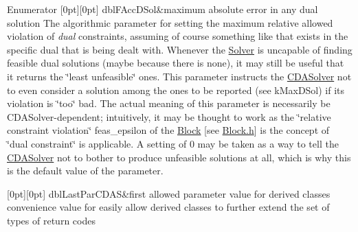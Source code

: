 \begin{DoxyEnumFields}{Enumerator}
[0pt][0pt]{}\mbox{\label{class_s_m_spp__di__unipi__it_1_1_c_d_a_solver_a12473d2c0cbab01587927c637e3f7e4ba80cb103dc992a8deaf4ffa1998b284fa}} 
dbl\+F\+Acc\+D\+Sol&maximum absolute error in any dual solution The algorithmic parameter for setting the maximum relative allowed violation of {\itshape dual} constraints, assuming of course something like that exists in the specific dual that is being dealt with. Whenever the \mbox{\hyperlink{class_s_m_spp__di__unipi__it_1_1_solver}{Solver}} is uncapable of finding feasible dual solutions (maybe because there is none), it may still be useful that it returns the \char`\"{}least unfeasible\char`\"{} ones. This parameter instructs the \mbox{\hyperlink{class_s_m_spp__di__unipi__it_1_1_c_d_a_solver}{C\+D\+A\+Solver}} not to even consider a solution among the ones to be reported (see k\+Max\+D\+Sol) if its violation is \char`\"{}too\char`\"{} bad. The actual meaning of this parameter is necessarily be C\+D\+A\+Solver-\/dependent; intuitively, it may be thought to work as the \char`\"{}relative constraint violation\char`\"{} feas\+\_\+epsilon of the \mbox{\hyperlink{class_s_m_spp__di__unipi__it_1_1_block}{Block}} \mbox{[}see \mbox{\hyperlink{_block_8h}{Block.\+h}}\mbox{]} is the concept of \char`\"{}dual constraint\char`\"{} is applicable. A setting of 0 may be taken as a way to tell the \mbox{\hyperlink{class_s_m_spp__di__unipi__it_1_1_c_d_a_solver}{C\+D\+A\+Solver}} not to bother to produce unfeasible solutions at all, which is why this is the default value of the parameter. \\
\hline

[0pt][0pt]{}\mbox{\label{class_s_m_spp__di__unipi__it_1_1_c_d_a_solver_a12473d2c0cbab01587927c637e3f7e4ba2558addd74555103399b7dbe2ae38b16}} 
dbl\+Last\+Par\+C\+D\+AS&first allowed parameter value for derived classes convenience value for easily allow derived classes to further extend the set of types of return codes \\
\hline

\end{DoxyEnumFields}
